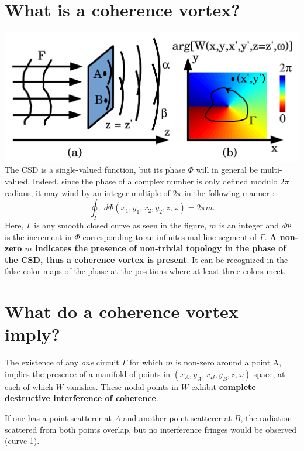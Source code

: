 \documentclass[a4paper,10pt]{article}
\begin{document}
\section{What is a coherence vortex?}


\includegraphics[width=1\textwidth]{Figures/coherence_vortex.png}
The CSD is a single-valued function, but its phase $\Phi$ will in general be multi-valued. Indeed, since the phase of a complex number is only defined modulo $2\pi$ radians, it may wind by an integer multiple of $2\pi$ in the following manner \cite{GburVisser2003}: 
\begin{equation}
\label{phase_of_W_winding}
\oint_{\Gamma} d\Phi(x_1,y_1,x_2,y_2,z,\omega)=2\pi m.
\end{equation}
Here, $\Gamma$ is any smooth closed curve as seen in the figure, $m$ is an integer and $d\Phi$ is the increment in $\Phi$ corresponding to an infinitesimal line segment of $\Gamma$.
{\bf A non-zero $m$ indicates the presence of non-trivial topology in the phase of the CSD, thus a coherence vortex \cite{GburVisser2003} is present}.  It can be recognized in the false color maps of the phase at the positions where at least three colors meet.

\section{What do a coherence vortex imply?}

The existence of any {\em one} circuit $\Gamma$ for which $m$ is non-zero around a point A, implies the presence of a manifold of points in $(x_A,y_A,x_B,y_B,z,\omega)$-space, at each of which $W$ vanishes. These nodal points in $W$ exhibit {\bf complete destructive interference of coherence}. 

If one has a point scatterer at $A$ and another point scatterer at $B$, the radiation scattered from both points overlap, but no interference fringes would be observed (curve 1).
\end{document}
